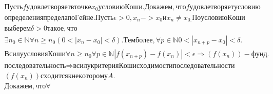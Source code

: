 \documentclass[a4paper]{article}
\begin{document}
\begin{equation*}
\begin{gathered}
\mathit{\text{П}\text{у}\text{с}\text{т}\text{ь}}f\mathit{\text{у}\text{д}\text{о}\text{в}\text{л}\text{е}\text{т}\text{в}\text{о}\text{р}\text{я}\text{е}\text{т}}\text{в}\mathit{\text{т}\text{о}\text{ч}\text{к}\text{е}}x_0\mathit{\text{у}\text{с}\text{л}\text{о}\text{в}\text{и}\text{ю}}\mathit{\text{К}\text{о}\text{ш}\text{и}.}\mathit{\text{Д}\text{о}\text{к}\text{а}\text{ж}\text{е}\text{м}},\mathit{\text{ч}\text{т}\text{о}}f\mathit{\text{у}\text{д}\text{о}\text{в}\text{л}\text{е}\text{т}\text{в}\text{о}\text{р}\text{я}\text{е}\text{т}}\mathit{\text{у}\text{с}\text{л}\text{о}\text{в}\text{и}\text{ю}}\\\mathit{\text{о}\text{п}\text{р}\text{е}\text{д}\text{е}\text{л}\text{е}\text{н}\text{и}\text{я}}\mathit{\text{п}\text{р}\text{е}\text{д}\text{е}\text{л}\text{а}}\mathit{\text{п}\text{о}}\mathit{\text{Г}\text{е}\text{й}\text{н}\text{е}.}\mathit{\text{П}\text{у}\text{с}\text{т}\text{ь}}\epsilon
>0,x_n->x_0\text{и}x_n\neq
x_{0.}\mathit{\text{П}\text{о}}\mathit{\text{у}\text{с}\text{л}\text{о}\text{в}\text{и}\text{ю}}\mathit{\text{К}\text{о}\text{ш}\text{и}}\\\mathit{\text{в}\text{ы}\text{б}\text{е}\text{р}\text{е}\text{м}}\delta
>0\mathit{\text{т}\text{а}\text{к}\text{о}\text{е}},\mathit{\text{ч}\text{т}\text{о}}\\\exists n_0\in \mathbb{N}\forall
n\ge n_0(0<|x_n-x_0|<\delta
).\mathit{\text{Т}\text{е}\text{м}}\mathit{\text{б}\text{о}\text{л}\text{е}\text{е}},\forall p\in
\mathbb{N}0<|x_{n+p}-x_0|<\delta
.\\\text{В}\mathit{\text{с}\text{и}\text{л}\text{у}}\mathit{\text{у}\text{с}\text{л}\text{о}\text{в}\text{и}\text{я}}\mathit{\text{К}\text{о}\text{ш}\text{и}}\forall
n\ge n_0\forall p\in \mathbb{N}|f(x_{n+p})-f(x_n)|<\epsilon \Rightarrow
(f(x_n))-\mathit{\text{ф}\text{у}\text{н}\text{д}.}\\\mathit{\text{п}\text{о}\text{с}\text{л}\text{е}\text{д}\text{о}\text{в}\text{а}\text{т}\text{е}\text{л}\text{ь}\text{н}\text{о}\text{с}\text{т}\text{ь}}\Rightarrow
\text{в}\mathit{\text{с}\text{и}\text{л}\text{у}}\mathit{\text{к}\text{р}\text{и}\text{т}\text{е}\text{р}\text{и}\text{я}}\mathit{\text{К}\text{о}\text{ш}\text{и}}\mathit{\text{с}\text{х}\text{о}\text{д}\text{и}\text{м}\text{о}\text{с}\text{т}\text{и}}\mathit{\text{п}\text{о}\text{с}\text{л}\text{е}\text{д}\text{о}\text{в}\text{а}\text{т}\text{е}\text{л}\text{ь}\text{н}\text{о}\text{с}\text{т}\text{и}}\\(f(x_n))\mathit{\text{с}\text{х}\text{о}\text{д}\text{и}\text{т}\text{с}\text{я}}\text{к}\mathit{\text{н}\text{е}\text{к}\text{о}\text{т}\text{о}\text{р}\text{о}\text{м}\text{у}}\mathit{A.}\\\mathit{\text{Д}\text{о}\text{к}\text{а}\text{ж}\text{е}\text{м}},\mathit{\text{ч}\text{т}\text{о}}\forall

\end{gathered}
\end{equation*}
\end{document}
